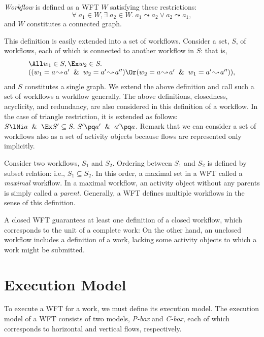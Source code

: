 {\em Workflow} is defined as a WFT $W$ satisfying these restrictions:
\[
 \forall\; a_1 \in W, \exists\; a_2 \in W.\ 
 a_1 \leadsto a_2 \vee a_2 \leadsto a_1,
\]
and $W$ constitutes a connected graph.

This definition is easily extended into a set of workflows.
Consider a set, $S$, of workflows, each of which is connected to another
workflow in $S$: that is, 
\[\begin{array}{l}
\All w_1\in S, \Ex w_2\in S.\ \\
((w_1=a\!\leadsto\!a'\And w_2=a'\!\leadsto\!a'')
\Or (w_2=a\!\leadsto\!a'\And w_1=a'\!\leadsto\!a'')),
\end{array}\]
and $S$ constitutes a single graph.  We extend the above definition and
call such a set of workflows a workflow generally.  The above
definitions, closedness, acyclicity, and redundancy, are also
considered in this definition of a workflow.  
In the case of triangle restriction, it is extended as follows:
$S\lMi a\And \Ex S'\subseteq S.\ S'\pq a'\And a'\pq a$.
Remark that we can
consider a set of workflows also as a set of activity objects because
flows are represented only implicitly.

Consider two workflows, $S_1$ and $S_2$.
Ordering between $S_1$ and $S_2$ is defined by subset relation: i.e.,
$S_1\subseteq S_2$.
In this order, a maximal set in a WFT called a {\em maximal} workflow.
In a maximal workflow, an activity object without any parents is
simply called a {\em parent}. 
Generally, a WFT defines multiple workflows in the sense of this definition.

A closed WFT guarantees at least one definition of a closed workflow,
which corresponds to the unit of a complete work: 
On the other hand, an unclosed workflow includes a definition of a work, 
lacking some activity objects to which a work might be submitted. 


\section{Execution Model}
\label{sec:execmodel}

To execute a WFT for a work, we must define its execution model.
The execution model of a WFT consists of two models, {\em P-box} and
{\em C-box}, each of which corresponds to horizontal and vertical flows, 
respectively.

